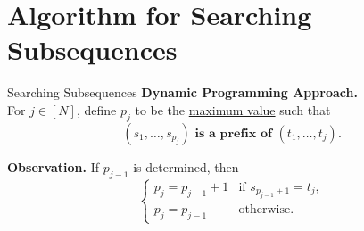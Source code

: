 \section{Algorithm for Searching Subsequences}
\begin{frame}{Searching Subsequences}
	\textbf{Dynamic Programming Approach.} \\
	For $j \in [N]$, define $p_j$ to be the \underline{maximum value} such that 
	\begin{equation*}
		\textbf{$(s_1, \dots, s_{p_j})$ is a prefix of $(t_1, \dots, t_j)$.}
	\end{equation*}
	
	\textbf{Observation.} If $p_{j - 1}$ is determined, then
	\begin{equation*}
		\begin{cases}
			p_j = p_{j - 1} + 1 &\text{if $s_{p_{j - 1} + 1} = t_j$},\\
			p_j = p_{j - 1} &\text{otherwise}.
		\end{cases}
	\end{equation*}
\end{frame}